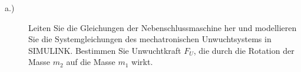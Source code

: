 \begin{description}
	\item[a.)]
	Leiten Sie die Gleichungen der Nebenschlussmaschine her und modellieren Sie die Systemgleichungen des mechatronischen Unwuchtsystems in SIMULINK. Bestimmen Sie Unwuchtkraft $F_U$, die durch die Rotation der Masse $m_2$ auf die Masse $m_1$ wirkt.
\end{description}